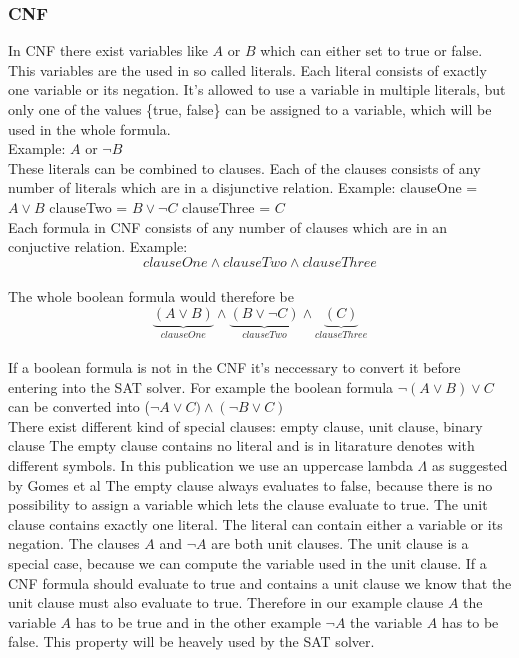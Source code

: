 \subsubsection{CNF}
In CNF there exist variables like $A$ or $B$ which can either set to true or false.
This variables are the used in so called literals. Each literal consists of exactly one variable or its negation. It's allowed to use a variable in multiple literals, but only one of the values \{true, false\} can be assigned to a variable, which will be used in the whole formula.\\
Example: $A$ or $\lnot B$\\
These literals can be combined to clauses. Each of the clauses consists of any number of literals which are in a disjunctive relation. 
Example: clauseOne = $A \lor B$ clauseTwo = $B \lor \lnot C$ clauseThree = $C$\\
Each formula in CNF consists of any number of clauses which are in an conjuctive relation. Example: $$clauseOne \land clauseTwo \land clauseThree$$\\
The whole boolean formula would therefore be $$\underbrace{(A \lor B)}_{clauseOne} \land \underbrace{(B \lor \lnot C)}_{clauseTwo} \land \underbrace{(C)}_{clauseThree}$$\\
If a boolean formula is not in the CNF it's neccessary to convert it before entering into the SAT solver. For example the boolean formula $\lnot(A \lor B) \lor C$ can be converted into ($\lnot A \lor C) \land (\lnot B \lor C)$\\
There exist different kind of special clauses: empty clause, unit clause, binary clause
The empty clause contains no literal and is in litarature denotes with different symbols. In this publication we use an uppercase lambda $\Lambda$ as suggested by Gomes et al \cite{Gomes2008SatisfiabilityS}
The empty clause always evaluates to false, because there is no possibility to assign a variable which lets the clause evaluate to true.
The unit clause contains exactly one literal. The literal can contain either a variable or its negation. The clauses $A$ and $\lnot A$ are both unit clauses. The unit clause is a special case, because we can compute the variable used in the unit clause. If a CNF formula should evaluate to true and contains a unit clause we know that the unit clause must also evaluate to true. Therefore in our example clause $A$ the variable $A$ has to be true and in the other example $\lnot A$ the variable $A$ has to be false. This property will be heavely used by the SAT solver.
